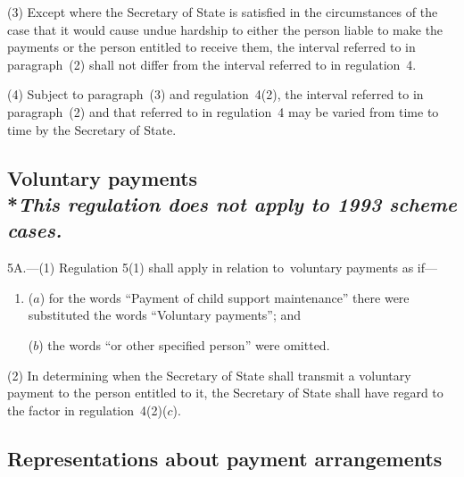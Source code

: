\documentclass[12pt,a4paper]{article}
\begin{document}
(3) Except where the Secretary of State is satisfied in the circumstances of the case that it would cause undue hardship to either the person liable to make the payments or the person entitled to receive them, the interval referred to in paragraph~(2) shall not differ from the interval referred to in regulation~4.

(4) Subject to paragraph~(3) and regulation~4(2), the interval referred to in paragraph~(2) and that referred to in regulation~4 may be varied from time to time by the Secretary of State.


\subsection[5A. Voluntary payments]{Voluntary payments\\*\emph{This regulation does not apply to 1993 scheme cases.}}

5A.---(1)  Regulation 5(1) shall apply in relation to~voluntary payments as if—
\begin{enumerate}\item[]
($a$) for the words “Payment of child support maintenance” there were substituted the words “Voluntary payments”; and

($b$) the words “or other specified person” were omitted.
\end{enumerate}

(2) In determining when the Secretary of State shall transmit a voluntary payment to the person entitled to it, the Secretary of State shall have regard to the factor in regulation~4(2)($c$).


\subsection[6. Representations about payment arrangements]{Representations about payment arrangements}
\end{document}
